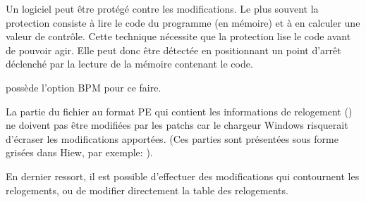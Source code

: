Un logiciel peut être protégé contre les modifications. Le plus souvent la protection consiste à
lire le code du programme (en mémoire) et à en calculer une valeur de contrôle.
Cette technique nécessite que la protection lise le code avant de pouvoir agir. Elle peut donc être
détectée en positionnant un point d'arrêt déclenché par la lecture de la mémoire contenant le code.

\tracer possède l'option BPM pour ce faire.

La partie du fichier au format PE qui contient les informations de relogement ()
ne doivent pas être modifiées par les patchs car le chargeur Windows risquerait d'écraser les
modifications apportées.
(Ces parties sont présentées sous forme grisées dans Hiew, par exemple:
).

En dernier ressort, il est possible d'effectuer des modifications qui contournent les relogements,
ou de modifier directement la table des relogements.
